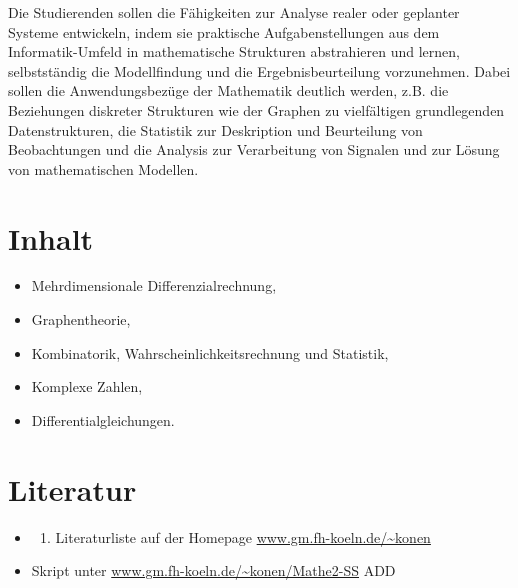 Die Studierenden sollen die Fähigkeiten zur Analyse realer oder
geplanter Systeme entwickeln, indem sie praktische Aufgabenstellungen
aus dem Informatik-Umfeld in mathematische Strukturen abstrahieren und
lernen, selbstständig die Modellfindung und die Ergebnisbeurteilung
vorzunehmen. Dabei sollen die Anwendungsbezüge der Mathematik deutlich
werden, z.B. die Beziehungen diskreter Strukturen wie der Graphen zu
vielfältigen grundlegenden Datenstrukturen, die Statistik zur
Deskription und Beurteilung von Beobachtungen und die Analysis zur
Verarbeitung von Signalen und zur Lösung von mathematischen Modellen.

\hypertarget{inhaltpathlabelmi-2017modulbeschreibungen-bachelorba_mathematik2}{%
\section*{Inhalt\label{/mi-2017/modulbeschreibungen-bachelor/BA_Mathematik2}}\label{inhaltpathlabelmi-2017modulbeschreibungen-bachelorba_mathematik2}}

\begin{itemize}
\tightlist
\item
  Mehrdimensionale Differenzialrechnung,
\item
  Graphentheorie,
\item
  Kombinatorik, Wahrscheinlichkeitsrechnung und Statistik,
\item
  Komplexe Zahlen,
\item
  Differentialgleichungen.
\end{itemize}

\hypertarget{literaturpathlabelmi-2017modulbeschreibungen-bachelorba_mathematik2}{%
\section*{Literatur\label{/mi-2017/modulbeschreibungen-bachelor/BA_Mathematik2}}\label{literaturpathlabelmi-2017modulbeschreibungen-bachelorba_mathematik2}}

\begin{itemize}
\tightlist
\item
  \begin{enumerate}
  \def\labelenumi{\alph{enumi}.}
  \setcounter{enumi}{18}
  \tightlist
  \item
    Literaturliste auf der Homepage
    \href{http://www.gm.fh-koeln.de/~konen}{www.gm.fh-koeln.de/\textasciitilde konen}
  \end{enumerate}
\item
  Skript unter
  \href{http://www.gm.fh-koeln.de/~konen/Mathe2-SS}{www.gm.fh-koeln.de/\textasciitilde konen/Mathe2-SS}
  ADD
\end{itemize}

